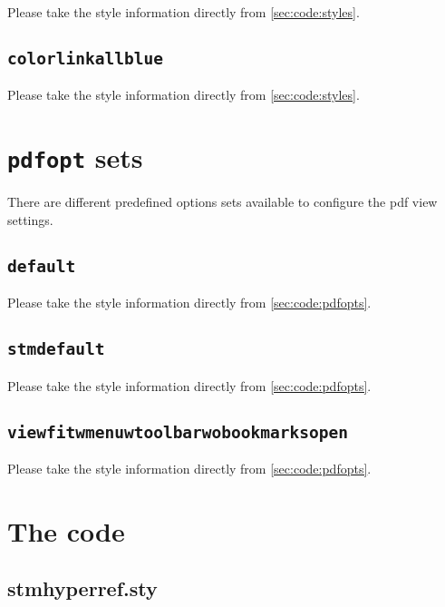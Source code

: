 \documentclass[%
  type=article,%
  layout=koma,%
  conditionallox=true,%
  conditionalloxnewpage=false,%
  date=true,%
  index=true,%
  listings=true%
]{stmtext}
\begin{document}
Please take the style information directly from \cref{sec:code:styles}.

\subsection{\protect\texttt{colorlinkallblue}}
\label{sec:styles:colorlinkallblue}

Please take the style information directly from \cref{sec:code:styles}.

\section{\protect\texttt{pdfopt} sets}
\label{sec:pdfopts}

There are different predefined options sets available to configure the pdf view settings.

\subsection{\protect\texttt{default}}
\label{sec:pdfopts:default}

Please take the style information directly from \cref{sec:code:pdfopts}.

\subsection{\protect\texttt{stmdefault}}
\label{sec:pdfopts:stmdefault}

Please take the style information directly from \cref{sec:code:pdfopts}.

\subsection{\protect\texttt{viewfitwmenuwtoolbarwobookmarksopen}}
\label{sec:pdfopts:viewfitwmenuwtoolbarwobookmarksopen}

Please take the style information directly from \cref{sec:code:pdfopts}.

\printstmindex

\newpage
\appendix

\section{The code}
\label{sec:code}

\subsection{stmhyperref.sty}
\label{sec:code:main}
\end{document}
